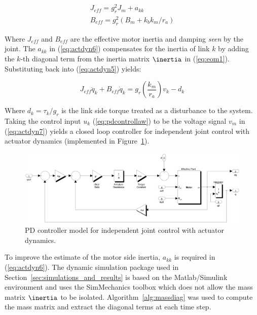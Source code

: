 \begin{equation}
	\begin{array}{l}
		{J_{eff}} = g_r^2{J_m} + {a_{kk}}\\
		{B_{eff}} = g_r^2({B_m} + {k_b}{k_m}/{r_a})
	\end{array}
	\label{eq:actdyn6}
\end{equation}

Where ${J_{eff}}$ and ${B_{eff}}$ are the effective motor inertia and damping \emph{seen} by the joint. The ${a_{kk}}$ in (\ref{eq:actdyn6}) compensates for the inertia of link $k$ by adding the $k$-th diagonal term from the inertia matrix $\inertia$ in (\ref{eq:eom1}). Substituting back into (\ref{eq:actdyn5}) yields: 

\begin{equation}
	{J_{eff}}{\ddot q_k} + {B_{eff}}{\dot q_k} = g_r^{}\left( {\frac{{{k_m}}}{{{r_a}}}} \right){v_k} - {d_k}
	\label{eq:actdyn7}
\end{equation}

Where ${d_k} = \tau _k / g _r$ is the link side torque treated as a disturbance to the system. Taking the control input $u _k$ (\ref{eq:pdcontrollaw}) to be the voltage signal $v _m$ in (\ref{eq:actdyn7}) yields a closed loop controller for independent joint control with actuator dynamics (implemented in Figure~\ref{fig:pdmotorcontroller}).

\begin{figure}[!h]
	\centering
    \includegraphics[scale=0.5]{fig/experiments/pdmotorcontroller.eps} 
  	\caption{PD controller model for independent joint control with actuator dynamics.}
	\label{fig:pdmotorcontroller}
\end{figure}

To improve the estimate of the motor side inertia, $a_{kk}$ is required in (\ref{eq:actdyn6}). The dynamic simulation package used in Section~\ref{sec:simulations_and_results} is based on the Matlab/Simulink environment and uses the SimMechanics toolbox which does not allow the mass matrix $\inertia$ to be isolated. Algorithm~\ref{alg:massdiag} was used to compute the mass matrix and extract the diagonal terms at each time step. \\

